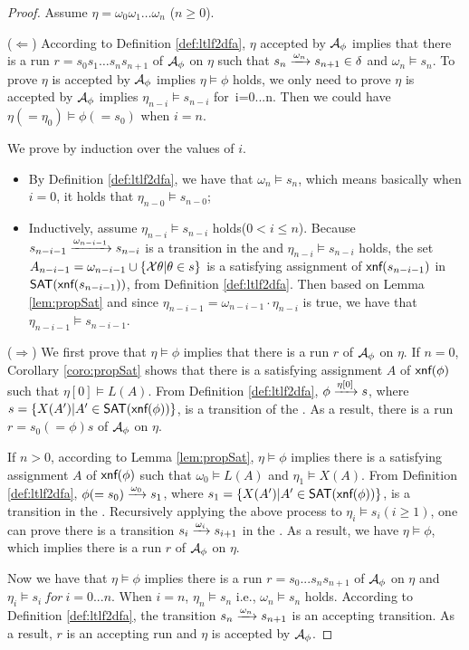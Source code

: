 \begin{proof}
Assume $\eta = \omega_0\omega_1\ldots\omega_n$ ($n\geq 0$). 

($\Leftarrow$) 
According to Definition \ref{def:ltlf2dfa},  $\eta$ accepted by ${\mathcal{A}_{\phi}}$ implies that there is a run $r=s_0s_1\ldots s_n s_{n+1}$ of ${\mathcal{A}_{\phi}}$ on $\eta$ such that $s_{n}\xrightarrow[]{\omega_{n}}s_{n+1} \in \delta$ and $\omega_n\models s_n$. To prove $\eta$ is accepted by ${\mathcal{A}_{\phi}}$ implies $\eta\models\phi$ holds, we only need to prove $\eta$ is accepted by ${\mathcal{A}_{\phi}}$ implies $\eta_{n-i}\models s_{n-i}$ for\ i=0...n. Then we could have $\eta (=\eta_0)\models \phi (=s_0)$ when $i=n$.

We prove by induction over the values of $i$.
\begin{itemize}
	\item By Definition \ref{def:ltlf2dfa}, we have that $\omega_n\models s_n$, which means basically when $i = 0$, it holds that $\eta_{n-0}\models s_{n-0}$;
	\item Inductively, assume $\eta_{n-i}\models s_{n-i}$ holds($0<i\leq n$). Because $s_{n-i-1}\xrightarrow[]{\omega_{n-i-1}}s_{n-i}$ is a transition in the \TDFA and $\eta_{n-i}\models s_{n-i}$ holds, the set $A_{n-i-1} = \omega_{n-i-1}\cup \{\mathcal{X}\theta | \theta\in s\}$ is a satisfying assignment of $\textsf{xnf}(s_{n-i-1})$ in $\textsf{SAT}(\textsf{xnf}(s_{n-i-1}))$, from Definition \ref{def:ltlf2dfa}. Then based on Lemma \ref{lem:propSat} and since $\eta_{n-i-1}=\omega_{n-i-1}\cdot\eta_{n-i}$ is true, we have that $\eta_{n-i-1}\models s_{n-i-1}$.
\end{itemize}

($\Rightarrow$) We first prove that $\eta\models\phi$ implies that there is a run $r$ of ${\mathcal{A}_{\phi}}$ on $\eta$. 
If $n = 0$, Corollary \ref{coro:propSat} shows that there is a satisfying assignment $A$ of $\textsf{xnf}(\phi)$ such that $\eta[0]\models L(A)$. From Definition \ref{def:ltlf2dfa}, $\phi\xrightarrow[]{\eta[0]}s$, where $s=\{X(A') | A'\in\textsf{SAT}(\textsf{xnf}(\phi))\}$, is a transition of the \TDFA. As a result, there is a run $r=s_0(=\phi)s$ of ${\mathcal{A}_{\phi}}$ on $\eta$.
 
If $n>0$, according to Lemma \ref{lem:propSat}, $\eta\models\phi$ implies there is a satisfying assignment $A$ of $\textsf{xnf}(\phi)$ such that $\omega_0\models L(A)$ and $\eta_1\models X(A)$. From Definition \ref{def:ltlf2dfa}, $\phi (=s_0)\xrightarrow[]{\omega_0}s_1$, where $s_1=\{X(A') | A'\in\textsf{SAT}(\textsf{xnf}(\phi))\}$, is a transition in the \TDFA. Recursively applying the above process to $\eta_i\models s_i(i\geq 1)$, one can prove there is a transition $s_i\xrightarrow[]{\omega_i}s_{i+1}$ in the \TDFA. As a result, we have $\eta\models\phi$, which implies there is a run $r$ of ${\mathcal{A}_{\phi}}$ on $\eta$.  

Now we have that $\eta\models\phi$ implies there is a run $r=s_0...s_n s_{n+1}$ of ${\mathcal{A}_{\phi}}$ on $\eta$ and $\eta_i\models s_i\ for\ i=0...n$. When $i=n$, $\eta_n\models s_n$ i.e., $\omega_n\models s_n$ holds. According to Definition \ref{def:ltlf2dfa}, the transition $s_n\xrightarrow[]{\omega_n}s_{n+1}$ is an accepting transition. As a result, $r$ is an accepting run and $\eta$ is accepted by ${\mathcal{A}_{\phi}}$.
\end{proof}
